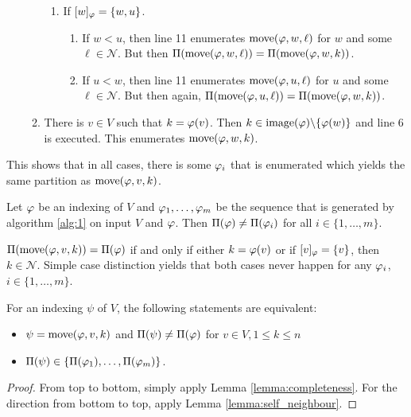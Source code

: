 \begin{appendixproof}
\begin{enumerate}
\begin{enumerate}
\begin{enumerate}
                \item If $[w]_\varphi = \{w,u\}$. 
                \begin{enumerate}
                    \item If $w < u$, then line 11 enumerates $\mathrm{move}(\varphi,w,\ell)$ for $w$ and some $\ell \in \mathcal{N}$. But then $\Pi(\mathrm{move}(\varphi,w,\ell)) = \Pi(\mathrm{move}(\varphi,w,k))$.
                    \item If $u < w$, then line 11 enumerates $\mathrm{move}(\varphi,u,\ell)$ for $u$ and some $\ell \in \mathcal{N}$. But then again, $\Pi(\mathrm{move}(\varphi,u,\ell)) = \Pi(\mathrm{move}(\varphi,w,k))$.
                \end{enumerate} 
            \end{enumerate}
            \item There is $v \in V$ such that $k = \varphi(v)$. Then $k \in \mathrm{image}(\varphi)\backslash \{ \varphi(w) \}$ and line 6 is executed. This enumerates $\mathrm{move}(\varphi,w,k)$.
        \end{enumerate}
    \end{enumerate}
    This shows that in all cases, there is some $\varphi_i$ that is enumerated which yields the same partition as $\mathrm{move}(\varphi,v,k)$.
\end{appendixproof}

\begin{lemmarep}
    Let $\varphi$ be an indexing of $V$ and $\varphi_1,\dots,\varphi_m$ be the sequence that is generated by algorithm \ref{alg:1} on input $V$ and $\varphi$. Then $\Pi(\varphi) \neq \Pi(\varphi_i)$ for all $i\in \{1,\dots,m\}$. \label{lemma:self_neighbour}
\end{lemmarep}
\begin{appendixproof}
    $\Pi(\mathrm{move}(\varphi,v,k)) = \Pi(\varphi)$ if and only if either $k=\varphi(v)$ or if $[v]_\varphi = \{v\}$, then $k \in \mathcal{N}$. Simple case distinction yields that both cases never happen for any $\varphi_i$, $i\in \{1,\dots,m\}$.
\end{appendixproof}

\begin{corollary}
    For an indexing $\psi$ of $V$, the following statements are equivalent:
    \begin{itemize}
        \item $\psi = \mathrm{move}(\varphi,v,k)$ and $\Pi(\psi)\neq \Pi(\varphi)$ for $v \in V, 1\leq k \leq n$
        \item $\Pi(\psi) \in \{\Pi(\varphi_1),\dots,\Pi(\varphi_m)\}$.
    \end{itemize}
\end{corollary}
\begin{proof}
    From top to bottom, simply apply Lemma \ref{lemma:completeness}. For the direction from bottom to top, apply Lemma \ref{lemma:self_neighbour}.
\end{proof}